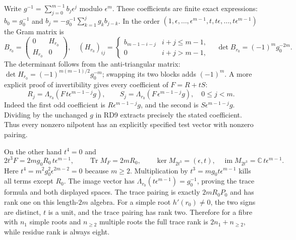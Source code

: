 \documentclass[11pt]{article}
\newcommand{\C}{\mathbb C}
\begin{document}
Write $g^{-1}=\sum_{j=0}^{m-1}b_j\epsilon^j$ modulo
$\epsilon^m$. These coefficients are finite exact expressions:
$b_0=g_0^{-1}$ and
$b_j=-g_0^{-1}\sum_{k=1}^j g_k b_{j-k}$.
In the order $(1,\epsilon,\ldots,\epsilon^{m-1},
t,t\epsilon,\ldots,t\epsilon^{m-1})$ the Gram matrix is
\begin{equation}
 B_{r_0}=\begin{pmatrix}0&H_{r_0}\\H_{r_0}&0\end{pmatrix},
 \quad (H_{r_0})_{ij}=
 \begin{cases}b_{m-1-i-j}&i+j\le m-1,\\0&i+j>m-1,\end{cases}
 \quad \det B_{r_0}=(-1)^m g_0^{-2m}.
 \tag{RD10}
\end{equation}
The determinant follows from the anti-triangular matrix:
$\det H_{r_0}=(-1)^{m(m-1)/2}g_0^{-m}$; swapping its two
blocks adds $(-1)^m$. A more explicit proof of invertibility
gives every coefficient of $F=R+tS$:
\begin{equation}
 R_j=\Lambda_{r_0}(F\,t\epsilon^{m-1-j}g),\qquad
 S_j=\Lambda_{r_0}(F\,\epsilon^{m-1-j}g),
 \quad 0\le j<m .
 \tag{RD11}
\end{equation}
Indeed the first odd coefficient is $R\epsilon^{m-1-j}g$,
and the second is $S\epsilon^{m-1-j}g$. Dividing by the
unchanged $g$ in RD9 extracts precisely the stated coefficient.
Thus every nonzero nilpotent has an explicitly specified
test vector with nonzero pairing.

On the other hand $t^4=0$ and
\begin{equation}
 2t^3F=2mg_0 R_0\,t\epsilon^{m-1},\qquad
 \operatorname{Tr}M_F=2mR_0,\qquad
 \ker M_{2t^3}=(\epsilon,t),\quad
 \operatorname{im}M_{2t^3}=\C\,t\epsilon^{m-1}.
 \tag{RD12}
\end{equation}
Here $t^4=m^2g_0^2\epsilon^{2m-2}=0$ because $m\ge2$.
Multiplication by $t^3=mg_0t\epsilon^{m-1}$ kills all
terms except $R_0$. The image vector has
$\Lambda_{r_0}(t\epsilon^{m-1})=g_0^{-1}$, proving
the trace formula and both displayed spaces. The trace
pairing is exactly $2mR_0P_0$ and has rank one on this
length-$2m$ algebra. For a simple root $h'(r_0)\ne0$,
the two signs are distinct, $t$ is a unit, and the trace
pairing has rank two. Therefore for a fibre with $n_1$
simple roots and $n_{\ge2}$ multiple roots the full trace
rank is $2n_1+n_{\ge2}$, while residue rank is always eight.
\end{document}
